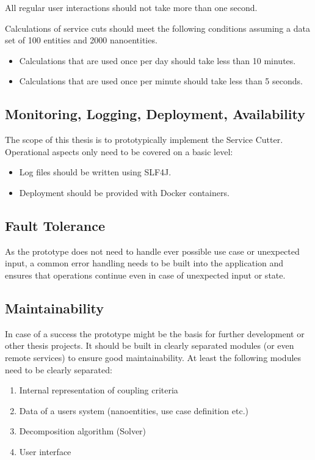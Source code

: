 All regular user interactions should not take more than one second.

Calculations of service cuts should meet the following conditions assuming a data set of 100 entities and 2000 nanoentities.

\begin{itemize}
\item Calculations that are used once per day should take less than 10 minutes.
\item Calculations that are used once per minute should take less than 5 seconds.
\end{itemize}

\subsection{Monitoring, Logging, Deployment, Availability}

The scope of this thesis is to prototypically implement the Service Cutter. Operational aspects only need to be covered on a basic level:

\begin{itemize}
	\item Log files should be written using SLF4J\cite{slf4j}.
	\item Deployment should be provided with Docker\cite{docker} containers.
\end{itemize} 

\subsection{Fault Tolerance}

As the prototype does not need to handle ever possible use case or unexpected input, a common error handling needs to be built into the application and ensures that operations continue even in case of unexpected input or state.

\subsection{Maintainability}

In case of a success the prototype might be the basis for further development or other thesis projects. It should be built in clearly separated modules (or even remote services) to ensure good maintainability. At least the following modules need to be clearly separated:


\begin{enumerate}
	\item Internal representation of coupling criteria
	\item Data of a users system (nanoentities, use case definition etc.) 
	\item Decomposition algorithm (Solver)
	\item User interface
\end{enumerate}

